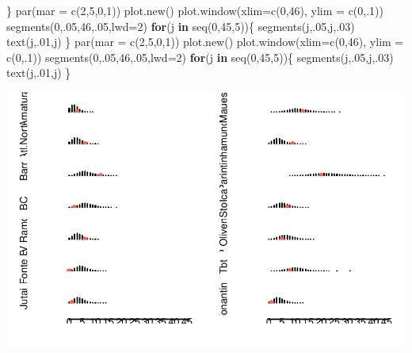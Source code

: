 \documentclass[
  letterpaper,
  DIV=11,
  numbers=noendperiod]{scrreprt}
\newenvironment{Shaded}{\begin{snugshade}}{\end{snugshade}}
\newcommand{\AttributeTok}[1]{\textcolor[rgb]{0.40,0.45,0.13}{#1}}
\newcommand{\ControlFlowTok}[1]{\textcolor[rgb]{0.00,0.23,0.31}{\textbf{#1}}}
\newcommand{\DecValTok}[1]{\textcolor[rgb]{0.68,0.00,0.00}{#1}}
\newcommand{\FunctionTok}[1]{\textcolor[rgb]{0.28,0.35,0.67}{#1}}
\newcommand{\NormalTok}[1]{\textcolor[rgb]{0.00,0.23,0.31}{#1}}
\theoremstyle{plain}
\theoremstyle{definition}
\theoremstyle{definition}
\theoremstyle{remark}
\begin{document}
\begin{Shaded}
\begin{Highlighting}[]
\NormalTok{\}}
  \FunctionTok{par}\NormalTok{(}\AttributeTok{mar =} \FunctionTok{c}\NormalTok{(}\DecValTok{2}\NormalTok{,}\DecValTok{5}\NormalTok{,}\DecValTok{0}\NormalTok{,}\DecValTok{1}\NormalTok{))}
  \FunctionTok{plot.new}\NormalTok{()}
  \FunctionTok{plot.window}\NormalTok{(}\AttributeTok{xlim=}\FunctionTok{c}\NormalTok{(}\DecValTok{0}\NormalTok{,}\DecValTok{46}\NormalTok{), }\AttributeTok{ylim =} \FunctionTok{c}\NormalTok{(}\DecValTok{0}\NormalTok{,.}\DecValTok{1}\NormalTok{))}
  \FunctionTok{segments}\NormalTok{(}\DecValTok{0}\NormalTok{,.}\DecValTok{05}\NormalTok{,}\DecValTok{46}\NormalTok{,.}\DecValTok{05}\NormalTok{,}\AttributeTok{lwd=}\DecValTok{2}\NormalTok{)}
 \ControlFlowTok{for}\NormalTok{(j }\ControlFlowTok{in} \FunctionTok{seq}\NormalTok{(}\DecValTok{0}\NormalTok{,}\DecValTok{45}\NormalTok{,}\DecValTok{5}\NormalTok{))\{}
    \FunctionTok{segments}\NormalTok{(j,.}\DecValTok{05}\NormalTok{,j,.}\DecValTok{03}\NormalTok{)}
    \FunctionTok{text}\NormalTok{(j,.}\DecValTok{01}\NormalTok{,j)}
\NormalTok{  \}}
    \FunctionTok{par}\NormalTok{(}\AttributeTok{mar =} \FunctionTok{c}\NormalTok{(}\DecValTok{2}\NormalTok{,}\DecValTok{5}\NormalTok{,}\DecValTok{0}\NormalTok{,}\DecValTok{1}\NormalTok{))}
  \FunctionTok{plot.new}\NormalTok{()}
  \FunctionTok{plot.window}\NormalTok{(}\AttributeTok{xlim=}\FunctionTok{c}\NormalTok{(}\DecValTok{0}\NormalTok{,}\DecValTok{46}\NormalTok{), }\AttributeTok{ylim =} \FunctionTok{c}\NormalTok{(}\DecValTok{0}\NormalTok{,.}\DecValTok{1}\NormalTok{))}
  \FunctionTok{segments}\NormalTok{(}\DecValTok{0}\NormalTok{,.}\DecValTok{05}\NormalTok{,}\DecValTok{46}\NormalTok{,.}\DecValTok{05}\NormalTok{,}\AttributeTok{lwd=}\DecValTok{2}\NormalTok{)}
  \ControlFlowTok{for}\NormalTok{(j }\ControlFlowTok{in} \FunctionTok{seq}\NormalTok{(}\DecValTok{0}\NormalTok{,}\DecValTok{45}\NormalTok{,}\DecValTok{5}\NormalTok{))\{}
    \FunctionTok{segments}\NormalTok{(j,.}\DecValTok{05}\NormalTok{,j,.}\DecValTok{03}\NormalTok{)}
    \FunctionTok{text}\NormalTok{(j,.}\DecValTok{01}\NormalTok{,j)}
\NormalTok{  \}}
\end{Highlighting}
\end{Shaded}

\includegraphics{poisson_files/figure-pdf/unnamed-chunk-4-1.pdf}
\end{document}
